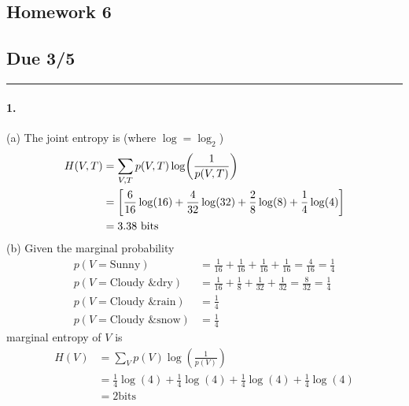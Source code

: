 \documentclass[../main.tex]{subfiles}
\begin{document}
\setcounter{section}{6}
\begin{center}
    \section*{Homework 6}
    \subsection*{Due 3/5}
\end{center}
\hrule \vspace{10px}

\paragraph*{1.} (a) The joint entropy is (where $\log = \log_2$)
\begin{align*}
    H(V,T) &= \sum_{V,T} p(V,T) \log(\frac{1}{p(V,T)}) \\
    &= \qt[\frac{6}{16}\log(16) + \frac{4}{32}\log(32) 
        + \frac{2}{8}\log(8) + \frac{1}{4} \log(4)] \\
    &= 3.38 \text{ bits}
\end{align*}
(b) Given the marginal probability
\begin{align*}
    p(V=\text{Sunny}) &= \frac{1}{16} + \frac{1}{16} + \frac{1}{16} + \frac{1}{16} = \frac{4}{16} = \frac{1}{4} \\
    p(V=\text{Cloudy \& dry}) &= \frac{1}{16} + \frac{1}{8} + \frac{1}{32} + \frac{1}{32} = \frac{8}{32} = \frac{1}{4} \\
    p(V=\text{Cloudy \& rain}) &= \frac{1}{4} \\
    p(V=\text{Cloudy \& snow}) &= \frac{1}{4}
\end{align*}
marginal entropy of $V$ is
\begin{align*}
    H(V) &= \sum_V p(V) \log(\frac{1}{p(V)}) \\
    &= \frac{1}{4}\log(4) + \frac{1}{4}\log(4) + \frac{1}{4}\log(4) + \frac{1}{4}\log(4) \\
    &= 2 \text{bits}
\end{align*}
\end{document}
